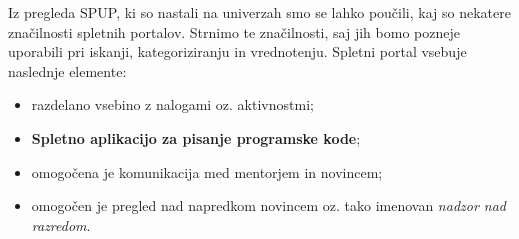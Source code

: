 Iz pregleda SPUP, ki so nastali na univerzah smo se lahko poučili, kaj
so nekatere značilnosti spletnih portalov. Strnimo te značilnosti, saj
jih bomo pozneje uporabili pri iskanji, kategoriziranju in
vrednotenju. Spletni portal vsebuje naslednje elemente:

\begin{itemize}
\tightlist
\item razdelano vsebino z nalogami oz. aktivnostmi;
\item \textbf{Spletno aplikacijo za pisanje programske kode};
\item omogočena je komunikacija med mentorjem in novincem;
\item omogočen je pregled nad napredkom novincem oz. tako imenovan
  \emph{nadzor nad razredom}.
\end{itemize}


